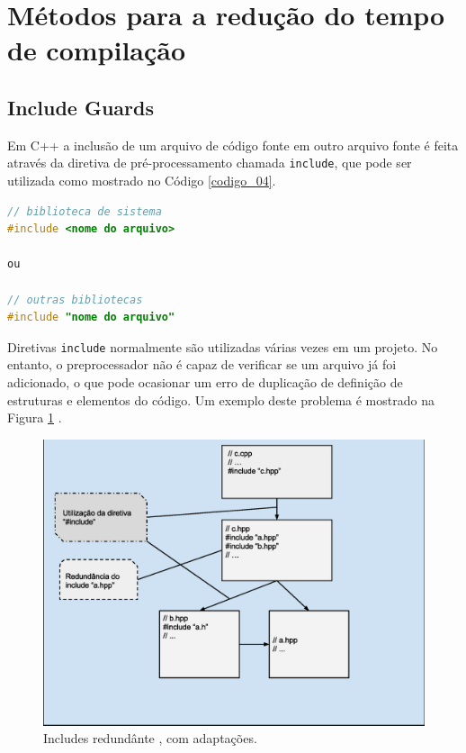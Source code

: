 \section{Métodos para a redução do tempo de compilação}

\subsection{Include Guards}\label{include_guards_section}

Em C++ a inclusão de um arquivo de código fonte em outro arquivo fonte é feita
 através da diretiva de pré-processamento chamada \texttt{include}, que pode 
ser utilizada como mostrado no Código \ref{codigo_04}. 

\begin{lstlisting}[language=C++,caption={Diretiva de 
                           pré-processamento para inclusão de arquivo},
                                                   label=codigo_04]
// biblioteca de sistema 
#include <nome do arquivo>  

ou

// outras bibliotecas 
#include "nome do arquivo"  

\end{lstlisting}


Diretivas \texttt{include} normalmente são utilizadas várias vezes em um projeto.
 No entanto, o preprocessador não é capaz de verificar se um arquivo já foi
 adicionado, o que pode ocasionar um erro de duplicação de definição de
 estruturas e elementos do código. Um exemplo deste problema é mostrado na
 Figura \ref{fig07} \cite[pag.57]{ref39}.

\begin{figure}[h]
    \centering
        \includegraphics[keepaspectratio=true,scale=0.55]{figuras/multi_include.eps}
    \caption{Includes redundânte \cite[pag. 80]{ref42}, com adaptações.}
    \label{fig07}
\end{figure}

